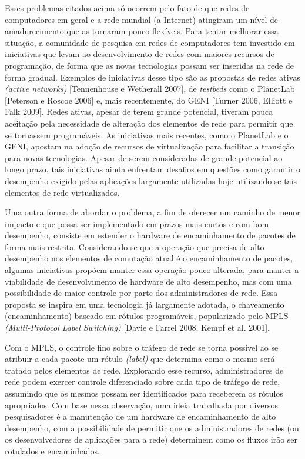 Esses problemas citados acima só ocorrem pelo fato de que redes
de computadores em geral e a rede mundial (a Internet)
atingiram um nível de amadurecimento que as tornaram pouco 
flexíveis.
Para tentar melhorar essa situação, a comunidade de pesquisa
em redes de computadores tem investido em iniciativas que
levam ao desenvolvimento de redes com maiores 
recursos de programação, de forma que as novas tecnologias
possam ser inseridas na rede de forma gradual. Exemplos de
iniciativas desse tipo são as propostas de redes ativas
\textit{(active networks)} [Tennenhouse e Wetherall 2007],
de \textit{testbeds} como o PlanetLab [Peterson e Roscoe 2006]
e, mais recentemente, do GENI [Turner 2006, Elliott e Falk
2009]. Redes ativas, apesar de terem grande potencial,
tiveram pouca aceitação pela necessidade de alteração dos
elementos de rede para permitir que se tornassem programáveis. As iniciativas 
mais recentes, como o PlanetLab e o GENI, apostam na adoção
de recursos de virtualização para facilitar a transição para
novas tecnologias. Apesar de serem consideradas de
grande potencial ao longo prazo, tais iniciativas ainda
enfrentam desafios em questões como garantir o desempenho
exigido pelas aplicações largamente utilizadas hoje
utilizando-se tais elementos de rede virtualizados.

Uma outra forma de abordar o problema, a fim de oferecer
um caminho de menor impacto e que possa ser implementado 
em prazos mais curtos e com bom desempenho, consiste
em estender o hardware de encaminhamento de pacotes
de forma mais restrita. Considerando-se que a operação 
que precisa de alto desempenho nos elementos de comutação
atual é o encaminhamento de pacotes, algumas iniciativas
propõem manter essa operação pouco alterada, para manter 
a viabilidade de desenvolvimento de hardware de alto
desempenho, mas com uma possibilidade de maior controle 
por parte dos administradores de rede. Essa proposta se inspira 
em uma tecnologia já largamente adotada, o chaveamento
(encaminhamento) baseado em rótulos programáveis, 
popularizado pelo MPLS \textit{(Multi-Protocol Label
 Switching)} [Davie e Farrel 2008, Kempf et al. 2001].

Com o MPLS, o controle fino sobre o tráfego de rede se torna 
possível ao se atribuir a cada pacote um rótulo \textit{(label)}
que determina como o mesmo será tratado pelos elementos
de rede. Explorando esse recurso, administradores de rede podem
exercer controle diferenciado sobre cada tipo de tráfego de rede,
assumindo que os mesmos possam ser identificados para
receberem os rótulos apropriados. Com base nessa observação,
uma ideia trabalhada por diversos pesquisadores é a manutenção 
de um hardware de encaminhamento de alto desempenho, com
a possibilidade de permitir que os administradores de redes (ou 
os desenvolvedores de aplicações para a rede) determinem como 
os fluxos irão ser rotulados e encaminhados.

